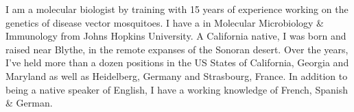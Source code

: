 


%


\begin{cvparagraph}

I am a molecular biologist by training with 15 years of experience working on the genetics of disease vector mosquitoes. I have a  in Molecular Microbiology \& Immunology from Johns Hopkins University. A California native, I was born and raised near Blythe, in the remote expanses of the Sonoran desert. Over the years, I've held more than a dozen positions in the US States of California, Georgia and Maryland as well as Heidelberg, Germany and Strasbourg, France. In addition to being a native speaker of English, I have a working knowledge of French, Spanish \& German.

\end{cvparagraph}
